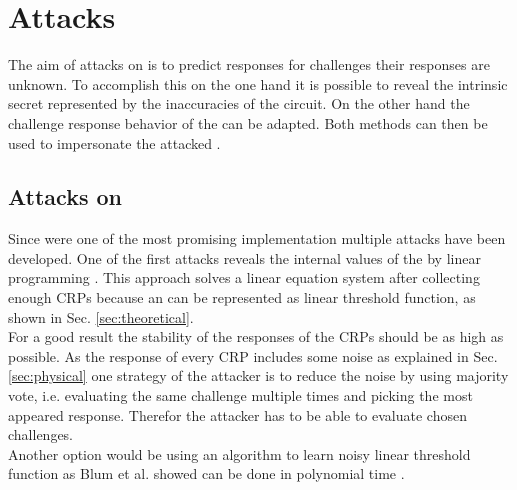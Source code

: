 \chapter{Attacks}
\label{cap:attacks}

The aim of attacks on \apuf is to predict responses for challenges their responses are unknown.
To accomplish this on the one hand it is possible to reveal the intrinsic secret represented by the inaccuracies of the \apuf circuit.
On the other hand the challenge response behavior of the \puf can be adapted.
Both methods can then be used to impersonate the attacked \puf.


\section{Attacks on \apufs}
\label{sec:attacksonarbiter}

Since \apufs were one of the most promising \puf implementation multiple attacks have been developed.
One of the first attacks reveals the internal values of the \apuf by linear programming \cite{Ozturk2008TowardsDevices}.
This approach solves a linear equation system after collecting enough \acp{CRP} because an \apuf can be represented as linear threshold function, as shown in Sec. \ref{sec:theoretical}.\\
For a good result the stability of the responses of the \acp{CRP} should be as high as possible.
As the response of every \ac{CRP} includes some noise as explained in Sec. \ref{sec:physical} one strategy of the attacker is to reduce the noise by using majority vote, i.e. evaluating the same challenge multiple times and picking the most appeared response.
Therefor the attacker has to be able to evaluate chosen challenges.\\
Another option would be using an algorithm to learn noisy linear threshold function as Blum et al. showed can be done in polynomial time \cite{Blum1998AlgorithmicaNoisy}.

